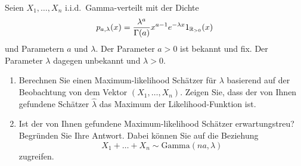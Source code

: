  Seien $X_1, \ldots,
X_n$ i.i.d.\ Gamma-verteilt mit der Dichte
\begin{equation*}
    p_{a,\lambda}(x) = \frac{\lambda^a}{\Gamma(a)}x^{a-1}e^{-\lambda x} 1_{\mathbb R_{>0}}(x)
\end{equation*}
und Parametern $a$ und $\lambda$. Der Parameter $a>0$ ist bekannt und fix. 
Der Parameter $\lambda$ dagegen unbekannt und $\lambda > 0$.
\begin{enumerate}
    \item Berechnen Sie einen Maximum-likelihood Schätzer für $\lambda$ 
        basierend auf der Beobachtung von dem Vektor
        $(X_1, \ldots, X_n)$. Zeigen Sie, dass der von Ihnen gefundene Schätzer 
        $\hat \lambda$ das Maximum der Likelihood-Funktion ist.
    \item Ist der von Ihnen gefundene Maximum-likelihood Schätzer erwartungstreu? 
        Begründen Sie Ihre Antwort. Dabei können Sie auf die Beziehung 
        \begin{equation*}
            X_1+ \ldots + X_n \sim \textrm{Gamma}(na,\lambda)
        \end{equation*}
        zugreifen.
\end{enumerate}

